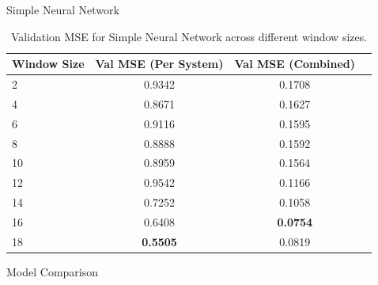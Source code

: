 \documentclass[aspectratio=169]{beamer}
\begin{document}
\begin{frame}{Simple Neural Network}
    \begin{table}[h]
\centering
\begin{tabular}{|l|c|c|c|}
\hline
\textbf{Window Size} & \textbf{Val MSE (Per System)} & \textbf{Val MSE (Combined)} \\
\hline
2  & 0.9342 & 0.1708 \\
4  & 0.8671 & 0.1627 \\
6  & 0.9116 & 0.1595 \\
8  & 0.8888 & 0.1592 \\
10 & 0.8959 & 0.1564 \\
12 & 0.9542 & 0.1166 \\
14 & 0.7252 & 0.1058 \\
16 & 0.6408 & \textbf{0.0754} \\
18 & \textbf{0.5505 }& 0.0819 \\
\hline
\end{tabular}
\caption{Validation MSE for Simple Neural Network across different window sizes.}
\label{tab:nn_val_mse}
\end{table}

\end{frame}
\begin{frame}{Model Comparison}
\begin{table}[h]
\centering
{}

\caption{Model comparison: best window size and Test MSE, per-system vs. combined.}
\label{tab:model_comparison_merged}
\end{table}
    
\end{frame}
\end{document}

